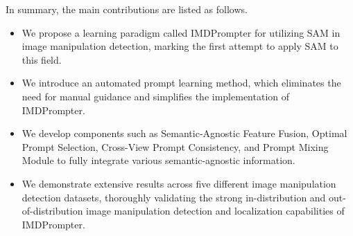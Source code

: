 In summary, the main contributions are listed as follows.
\begin{itemize}
    \item We propose a learning paradigm called IMDPrompter for utilizing SAM in image manipulation detection, marking the first attempt to apply SAM to this field.
    \item We introduce an automated prompt learning method, which eliminates the need for manual guidance and simplifies the implementation of IMDPrompter.
    \item We develop components such as Semantic-Agnostic Feature Fusion, Optimal Prompt Selection, Cross-View Prompt Consistency, and Prompt Mixing Module to fully integrate various semantic-agnostic information.
    \item We demonstrate extensive results across five different image manipulation detection datasets, thoroughly validating the strong in-distribution and out-of-distribution image manipulation detection and localization capabilities of IMDPrompter.
\end{itemize}


        
    


